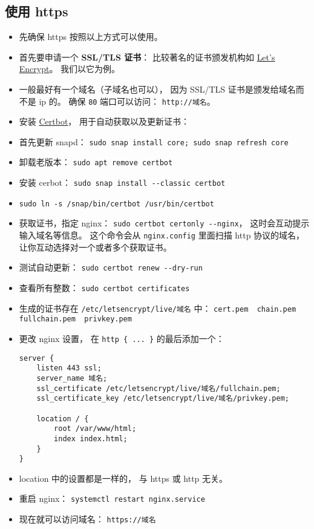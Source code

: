 \subsection{使用 https}
\begin{itemize}
\item 先确保 https 按照以上方式可以使用。
\item 首先要申请一个 \textbf{SSL/TLS 证书}： 比较著名的证书颁发机构如 \href{https://letsencrypt.org/}{Let's Encrypt}。 我们以它为例。
\item 一般最好有一个域名（子域名也可以）， 因为 SSL/TLS 证书是颁发给域名而不是 ip 的。 确保 \verb`80` 端口可以访问： \verb`http://域名`。
\item 安装 \href{https://certbot.eff.org/instructions?ws=nginx&os=ubuntufocal}{Certbot}， 用于自动获取以及更新证书：
\item 首先更新 snapd： \verb`sudo snap install core; sudo snap refresh core`
\item 卸载老版本： \verb`sudo apt remove certbot`
\item 安装 cerbot： \verb`sudo snap install --classic certbot`
\item \verb`sudo ln -s /snap/bin/certbot /usr/bin/certbot`
\item 获取证书，指定 nginx： \verb`sudo certbot certonly --nginx`， 这时会互动提示输入域名等信息。 这个命令会从 \verb`nginx.config` 里面扫描 http 协议的域名， 让你互动选择对一个或者多个获取证书。
\item 测试自动更新： \verb`sudo certbot renew --dry-run`
\item 查看所有整数： \verb`sudo certbot certificates`
\item 生成的证书存在 \verb`/etc/letsencrypt/live/域名` 中： \verb`cert.pem  chain.pem  fullchain.pem  privkey.pem`
\item 更改 nginx 设置， 在 \verb`http { ... }` 的最后添加一个：
\begin{lstlisting}[language=none]
server {
    listen 443 ssl;
    server_name 域名;
    ssl_certificate /etc/letsencrypt/live/域名/fullchain.pem;
    ssl_certificate_key /etc/letsencrypt/live/域名/privkey.pem;

    location / {
        root /var/www/html;
        index index.html;
    }
}
\end{lstlisting}
\item location 中的设置都是一样的， 与 https 或 http 无关。
\item 重启 nginx： \verb`systemctl restart nginx.service`
\item 现在就可以访问域名： \verb`https://域名`
\end{itemize}

